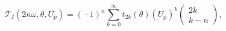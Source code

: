 \begin{equation}
\mathcal{T}_{I}(2n\omega ,\theta ,U_{p})=(-1)^{n}\sum_{k=0}^{\infty
}t_{2k}(\theta )\left( U_{p}\right) ^{k}\left( 
\begin{array}{c}
2k \\ 
k-n%
\end{array}
\right) ,  \label{tss}
\end{equation}

